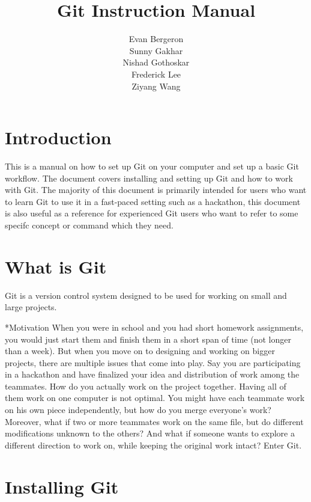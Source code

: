 \documentclass{amsart}
\title{Git Instruction Manual}
\author{Evan Bergeron\\
Sunny Gakhar\\
Nishad Gothoskar\\
Frederick Lee\\
Ziyang Wang
}
\makeatletter
\renewcommand\subsection{\@startsection{subsection}{2}%
  \z@{-.5\linespacing\@plus-.7\linespacing}{.5\linespacing}%
  {\normalfont\scshape}}
\makeatother
\begin{document}
\maketitle

\tableofcontents
\newpage
\section*{Introduction}

This is a manual on how to set up Git on your computer and set up a basic Git workflow. The document covers installing and setting up Git and how to work with Git. The majority of this document is primarily intended for users who want to learn Git to use it in a fast-paced setting such as a hackathon, this document is also useful as a reference for experienced Git users who want to refer to some specifc concept or command which they need.

\section*{What is Git}

Git is a version control system designed to be used for working on small and large projects.

\subsection*{Motivation}
When you were in school and you had short homework assignments, you would just start them and finish them in a short span of time (not longer than a week). But when you move on to designing and working on bigger projects, there are multiple issues that come into play. Say you are participating in a hackathon and have finalized your idea and distribution of work among the teammates. How do you actually work on the project together. Having all of them work on one computer is not optimal. You might have each teammate work on his own piece independently, but how do you merge everyone's work? Moreover, what if two or more teammates work on the same file, but do different modifications unknown to the others? And what if someone wants to explore a different direction to work on, while keeping the original work intact? Enter Git.

\newpage

\section*{Installing Git}
\end{document}
